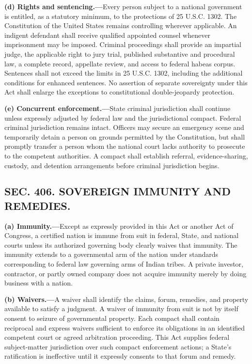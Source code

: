 \documentclass[12pt,letterpaper]{article}
\begin{document}
\textbf{(d) Rights and sentencing.---}Every person subject to a national government is entitled, as a statutory minimum, to the protections of 25 U.S.C. 1302. The Constitution of the United States remains controlling wherever applicable. An indigent defendant shall receive qualified appointed counsel whenever imprisonment may be imposed. Criminal proceedings shall provide an impartial judge, the applicable right to jury trial, published substantive and procedural law, a complete record, appellate review, and access to federal habeas corpus. Sentences shall not exceed the limits in 25 U.S.C. 1302, including the additional conditions for enhanced sentences. No assertion of separate sovereignty under this Act shall enlarge the exceptions to constitutional double-jeopardy protection.

\textbf{(e) Concurrent enforcement.---}State criminal jurisdiction shall continue unless expressly adjusted by federal law and the jurisdictional compact. Federal criminal jurisdiction remains intact. Officers may secure an emergency scene and temporarily detain a person on grounds permitted by the Constitution, but shall promptly transfer a person whom the national court lacks authority to prosecute to the competent authorities. A compact shall establish referral, evidence-sharing, custody, and detention arrangements before criminal jurisdiction begins.

\subsection*{SEC. 406. SOVEREIGN IMMUNITY AND REMEDIES.}

\textbf{(a) Immunity.---}Except as expressly provided in this Act or another Act of Congress, a certified nation is immune from suit in federal, State, and national courts unless its authorized governing body clearly waives that immunity. The immunity extends to a governmental arm of the nation under standards corresponding to federal law governing arms of Indian tribes. A private investor, contractor, or partly owned company does not acquire immunity merely by doing business with a nation.

\textbf{(b) Waivers.---}A waiver shall identify the claims, forum, remedies, and property available to satisfy a judgment. A waiver of immunity from suit is not by itself consent to seizure of governmental property. Each compact shall contain reciprocal and express waivers sufficient to enforce its obligations in an identified competent court or agreed arbitration proceeding. This Act supplies federal subject-matter jurisdiction over such compact enforcement actions; a State's ratification is ineffective until it expressly consents to that forum and remedy.
\end{document}
